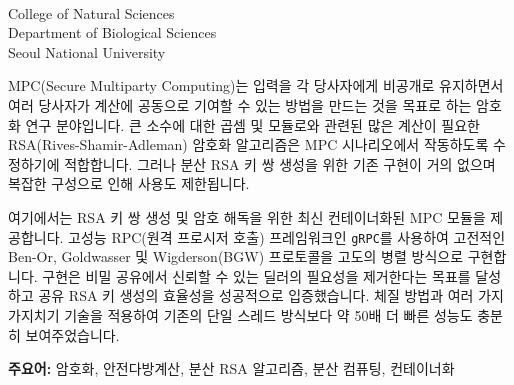 \thispagestyle{empty}
\begin{abstract*}
  \makeatletter
  \begin{center}
    {\Huge \@titlealt }
  \end{center}

  \begin{flushright}
    {\large\@author \\
      College of Natural Sciences \\
      Department of Biological Sciences \\
      Seoul National University \\
    }
  \end{flushright}
  \normalsize
  MPC(Secure Multiparty Computing)는 입력을 각 당사자에게 비공개로 유지하면서 여러 당사자가 계산에 공동으로 기여할 수 있는 방법을 만드는 것을 목표로 하는 암호화 연구 분야입니다. 큰 소수에 대한 곱셈 및 모듈로와 관련된 많은 계산이 필요한 RSA(Rives-Shamir-Adleman) 암호화 알고리즘은 MPC 시나리오에서 작동하도록 수정하기에 적합합니다. 그러나 분산 RSA 키 쌍 생성을 위한 기존 구현이 거의 없으며 복잡한 구성으로 인해 사용도 제한됩니다.\par
  여기에서는 RSA 키 쌍 생성 및 암호 해독을 위한 최신 컨테이너화된 MPC 모듈을 제공합니다. 고성능 RPC(원격 프로시저 호출) 프레임워크인 \texttt{gRPC}를 사용하여 고전적인 Ben-Or, Goldwasser 및 Wigderson(BGW) 프로토콜을 고도의 병렬 방식으로 구현합니다. 구현은 비밀 공유에서 신뢰할 수 있는 딜러의 필요성을 제거한다는 목표를 달성하고 공유 RSA 키 생성의 효율성을 성공적으로 입증했습니다. 체질 방법과 여러 가지 가지치기 기술을 적용하여 기존의 단일 스레드 방식보다 약 50배 더 ​​빠른 성능도 충분히 보여주었습니다.
  \makeatother
\end{abstract*}
\textbf{주요어: } 암호화, 안전다방계산, 분산 RSA 알고리즘, 분산 컴퓨팅, 컨테이너화
\vfill
